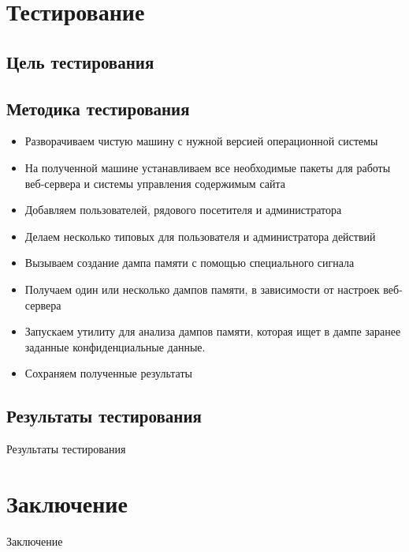 \documentclass[20pt]{article}
\begin{document}
\newpage

\section{Тестирование}

\subsection{Цель тестирования}

\subsection{Методика тестирования}

\begin{itemize}
  \item Разворачиваем чистую машину с нужной версией операционной системы
  \item На полученной машине устанавливаем все необходимые пакеты для работы
  веб-сервера и системы управления содержимым сайта
  \item Добавляем пользователей, рядового посетителя и администратора
  \item Делаем несколько типовых для пользователя и администратора действий
  \item Вызываем создание дампа памяти с помощью специального сигнала
  \item Получаем один или несколько дампов памяти, в зависимости от настроек
  веб-сервера
  \item Запускаем утилиту для анализа дампов памяти, которая ищет в дампе
  заранее заданные конфиденциальные данные.
  \item Сохраняем полученные результаты
\end{itemize}

\subsection{Результаты тестирования}
Результаты тестирования

\newpage

\section{Заключение}
Заключение

\newpage



\end{document}
